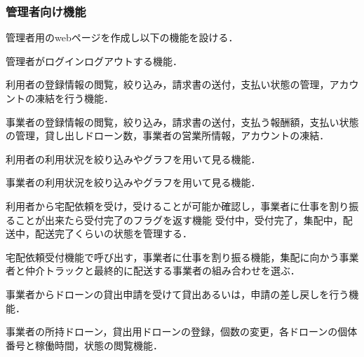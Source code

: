 \documentclass[a4paper, titlepage]{jsarticle}
\begin{document}
\subsubsection{管理者向け機能}
管理者用のwebページを作成し以下の機能を設ける．
\begin{description}[labelwidth=\linewidth]
  \setlength{\leftskip}{1em}
\item [ログインログアウト機能]管理者がログインログアウトする機能．
\item [利用者管理機能]利用者の登録情報の閲覧，絞り込み，請求書の送付，支払い状態の管理，アカウントの凍結を行う機能．
\item [事業者管理機能]事業者の登録情報の閲覧，絞り込み，請求書の送付，支払う報酬額，支払い状態の管理，貸し出しドローン数，事業者の営業所情報，アカウントの凍結．
\item [利用者情報分析機能]利用者の利用状況を絞り込みやグラフを用いて見る機能．
\item [事業者情報分析機能]事業者の利用状況を絞り込みやグラフを用いて見る機能．
\item [宅配依頼受付機能]利用者から宅配依頼を受け，受けることが可能か確認し，事業者に仕事を割り振ることが出来たら受付完了のフラグを返す機能 受付中，受付完了，集配中，配送中，配送完了くらいの状態を管理する．
\item [宅配仕事割り振り機能]宅配依頼受付機能で呼び出す，事業者に仕事を割り振る機能，集配に向かう事業者と仲介トラックと最終的に配送する事業者の組み合わせを選ぶ．
\item [ドローン貸出機能]事業者からドローンの貸出申請を受けて貸出あるいは，申請の差し戻しを行う機能．
\item [事業者ドローン情報管理機能]事業者の所持ドローン，貸出用ドローンの登録，個数の変更，各ドローンの個体番号と稼働時間，状態の閲覧機能．
\end{description}
\end{document}
